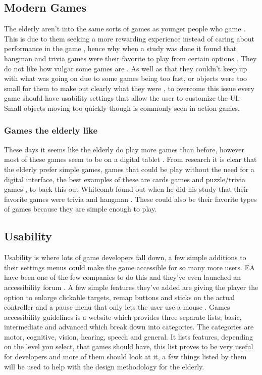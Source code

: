 \documentclass[journal]{IEEEtran}
\begin{document}
\subsection{Modern Games}
The elderly aren't into the same sorts of games as younger people who game \cite{ijsselsteijn_digital_2007}. This is due to them seeking a more rewarding experience instead of caring about performance in the game \cite{ijsselsteijn_digital_2007}, hence why when a study was done it found that hangman and trivia games were their favorite to play  from certain options \cite{whitcomb_computer_1990}. They do not like how vulgar some games are \cite{whitcomb_computer_1990}. As well as that they couldn't keep up with what was going on due to some games being too fast, or objects were too small for them to make out clearly what they were \cite{whitcomb_computer_1990}, to overcome this issue every game should have usability settings that allow the user to customize the UI. Small objects moving too quickly though is commonly seen in action games.
\subsubsection{Games the elderly like}
These days it seems like the elderly do play more games than before, however most of these games seem to be on a digital tablet \cite{jenkin_rise_2014}. From research it is clear that the elderly prefer simple games, games that could be play without the need for a digital interface, the best examples of these are cards games and puzzle/trivia games \cite{noauthor_nearly_nodate}, to back this out Whitcomb found out when he did his study that their favorite games were trivia and hangman \cite{whitcomb_computer_1990}. These could also be their favorite types of games because they are simple enough to play. 

\subsection{Usability}
Usability is where lots of game developers fall down, a few simple additions to their settings menus could make the game accessible for so many more users. EA have been one of the few companies to do this and they've even launched an accessibility forum \cite{noauthor_ea_nodate}. A few simple features they've added are giving the player the option to enlarge clickable targets, remap buttons and sticks on the actual controller and a pause menu that only lets the user use a mouse \cite{mcaloon_look_nodate}.
\newline
Games accessibility guidelines \cite{noauthor_game_nodate} is a website which provides three separate lists; basic, intermediate and advanced which break down into categories. The categories are motor, cognitive, vision, hearing, speech and general. It lists features, depending on the level you select, that games should have, this list proves to be very useful for developers and more of them should look at it, a few things listed by them will be used to help with the design methodology for the elderly. 
\end{document}
